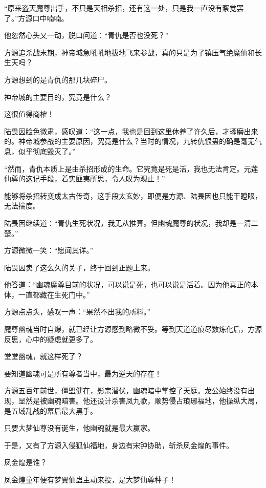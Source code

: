 
\begin{this_body}

“原来盗天魔尊出手，不只是天相杀招，还有这一处，只是我一直没有察觉罢了。”方源口中喃喃。

他忽然心头又一动，脱口问道：“青仇是否也没死？”

方源追杀战末期，神帝城急吼吼地拔地飞来参战，真的只是为了镇压气绝魔仙和长生天吗？

方源想到的是青仇的那几块碎尸。

神帝城的主要目的，究竟是什么？

这很值得商榷！

陆畏因脸色微肃，感叹道：“这一点，我也是回到这里休养了许久后，才琢磨出来的。神帝城参战的主要原因，究竟是什么？当时的情况，九转仇恨蛊的确是毫无气息，似乎彻底毁灭了。”

“然而，青仇本质上是由杀招形成的生命。它究竟是死是活，我也无法肯定。元莲仙尊的这记手段，着实匪夷所思，令人叹为观止！”

能够将杀招转变成太古传奇，这手段太玄妙，即便是方源、陆畏因也只能干瞪眼，无法揣度。

陆畏因继续道：“青仇生死状况，我无从推算。但幽魂魔尊的状况，我却是一清二楚。”

方源微微一笑：“愿闻其详。”

陆畏因卖了这么久的关子，终于回到正题上来。

他答道：“幽魂魔尊目前的状况，可以说是死，也可以说是活着。因为他真正的本体，一直都藏在生死门中。”

方源点点头，感叹一声：“果然不出我的所料。”

魔尊幽魂当时自爆，就已经让方源感到略微不妥。等到天道道痕尽数炼化后，方源反思，心中的疑虑就更多了。

堂堂幽魂，就这样死了？

要知道幽魂可是所有尊者当中，最为逆天的存在！

方源五百年前世，僵盟健在，影宗潜伏，幽魂暗中掌控了天庭。龙公始终没有出现，显然是被幽魂暗害。他还设计杀害凤九歌，顺势侵占琅琊福地，他操纵大局，是五域乱战的幕后最大黑手。

只要大梦仙尊没有诞生，他幽魂就是最大赢家。

于是，又有了方源入侵狐仙福地，身边有宋钟协助，斩杀凤金煌的事件。

凤金煌是谁？

凤金煌童年便有梦翼仙蛊主动来投，是大梦仙尊种子！


\end{this_body}
